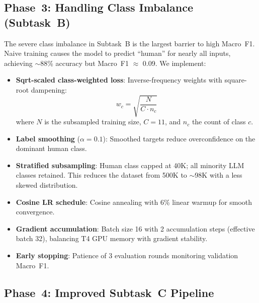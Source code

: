 \documentclass[11pt]{article}
\begin{document}
\subsection{Phase~3: Handling Class Imbalance (Subtask~B)}
\label{sec:imbalance}

The severe class imbalance in Subtask~B is the largest barrier to high Macro~F1. Naive training causes the model to predict ``human'' for nearly all inputs, achieving $\sim$88\% accuracy but Macro~F1 $\approx$ 0.09. We implement:

\begin{itemize}
    \item \textbf{Sqrt-scaled class-weighted loss}: Inverse-frequency weights with square-root dampening:
    \begin{equation}
    w_c = \sqrt{\frac{N}{C \cdot n_c}}
    \label{eq:class_weights}
    \end{equation}
    where $N$ is the subsampled training size, $C{=}11$, and $n_c$ the count of class $c$.

    \item \textbf{Label smoothing} ($\alpha{=}0.1$): Smoothed targets reduce overconfidence on the dominant human class.

    \item \textbf{Stratified subsampling}: Human class capped at 40K; all minority LLM classes retained. This reduces the dataset from 500K to $\sim$98K with a less skewed distribution.

    \item \textbf{Cosine LR schedule}: Cosine annealing with 6\% linear warmup for smooth convergence.

    \item \textbf{Gradient accumulation}: Batch size 16 with 2 accumulation steps (effective batch 32), balancing T4 GPU memory with gradient stability.

    \item \textbf{Early stopping}: Patience of 3 evaluation rounds monitoring validation Macro~F1.
\end{itemize}

\subsection{Phase~4: Improved Subtask~C Pipeline}
\label{sec:taskC_method}
\end{document}
